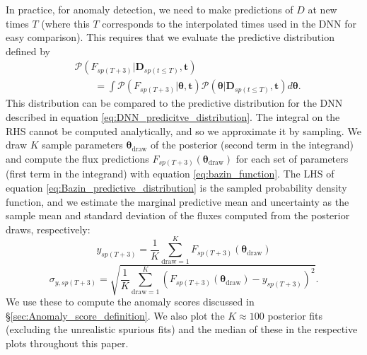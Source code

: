 \documentclass[fleqn,usenatbib]{mnras}
\begin{document}
In practice, for anomaly detection, we need to make predictions of $D$ at new times $T$ (where this $T$ corresponds to the interpolated times used in the DNN for easy comparison). This requires that we evaluate the predictive distribution defined by
\begin{equation}
\begin{split}
    &\mathcal{P}(F_{sp(T+3)} | \bm{D}_{sp(t \le T)}, \bm{t}) \\ 
    & \qquad = \int \mathcal{P}(F_{sp(T+3)}|\bm{\theta}, \bm{t}) \mathcal{P}(\bm{\theta}|\bm{D}_{sp(t \le T)}, \bm{t}) d\bm{\theta}.
\end{split}
\label{eq:Bazin_predictive_distribution}
\end{equation}
This distribution can be compared to the predictive distribution for the DNN described in equation \ref{eq:DNN_predicitve_distribution}. The integral on the RHS cannot be computed analytically, and so we approximate it by sampling. We draw $K$ sample parameters $\bm{\theta}_{\mathrm{draw}}$ of the posterior (second term in the integrand) and compute the flux predictions $F_{sp(T+3)}(\bm{\theta}_{\mathrm{draw}})$ for each set of parameters (first term in the integrand) with equation \ref{eq:bazin_function}. The LHS of equation \ref{eq:Bazin_predictive_distribution} is the sampled probability density function, and we estimate the marginal predictive mean and uncertainty as the sample mean and standard deviation of the fluxes computed from the posterior draws, respectively: 
\begin{equation}
    y_{sp(T+3)} = \frac{1}{K} \sum_{\mathrm{draw=1}}^{K} F_{sp(T+3)}(\bm{\theta}_{\mathrm{draw}})
\end{equation}
\begin{equation}
    \sigma_{y,{sp(T+3)}}  = \sqrt{\frac{1}{K} \sum_{\mathrm{draw=1}}^{K} \left( F_{sp(T+3)}(\bm{\theta}_{\mathrm{draw}}) - y_{sp(T+3)} \right)^2}.
\end{equation}
We use these to compute the anomaly scores discussed in \S\ref{sec:Anomaly_score_definition}.  We also plot the $K \approx 100$ posterior fits (excluding the unrealistic spurious fits) and the median of these in the respective plots throughout this paper. 
\end{document}
